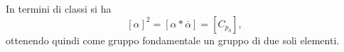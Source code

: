 \begin{itemize}
\begin{center}
		\end{center}
		In termini di classi si ha
		\begin{equation*}
			\left[\alpha\right]^2=\left[\alpha\ast\overline{\alpha}\right]=\left[C_{p_0}\right],
		\end{equation*}
		ottenendo quindi come gruppo fondamentale un gruppo di due soli elementi.
	\end{itemize}